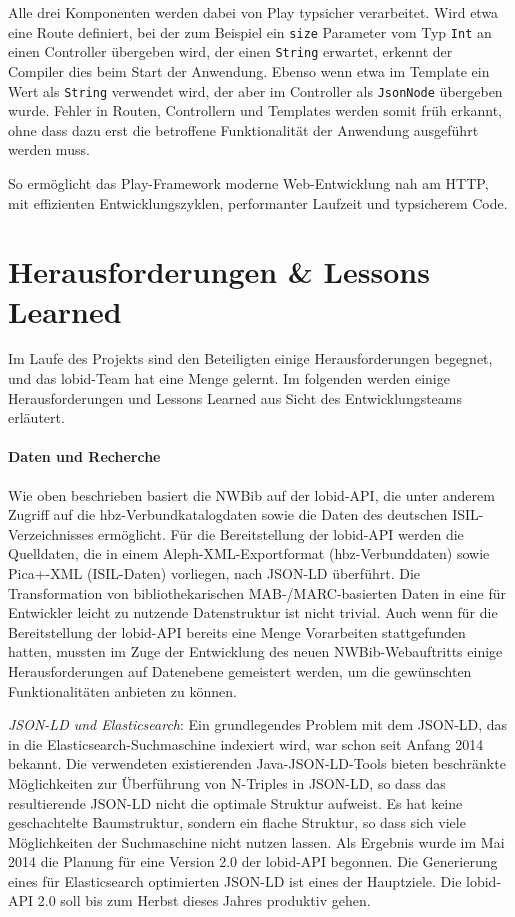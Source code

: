 \documentclass[a4paper,
fontsize=11pt,
oneside,
numbers=noperiodatend,
parskip=half-,
bibliography=totoc,
final
]{scrartcl}
\begin{document}
Alle drei Komponenten werden dabei von Play typsicher verarbeitet. Wird
etwa eine Route definiert, bei der zum Beispiel ein \texttt{size}
Parameter vom Typ \texttt{Int} an einen Controller übergeben wird, der
einen \texttt{String} erwartet, erkennt der Compiler dies beim Start der
Anwendung. Ebenso wenn etwa im Template ein Wert als \texttt{String}
verwendet wird, der aber im Controller als \texttt{JsonNode} übergeben
wurde. Fehler in Routen, Controllern und Templates werden somit früh
erkannt, ohne dass dazu erst die betroffene Funktionalität der Anwendung
ausgeführt werden muss.

So ermöglicht das Play-Framework moderne Web-Entwicklung nah am HTTP,
mit effizienten Entwicklungszyklen, performanter Laufzeit und
typsicherem Code.

\section*{Herausforderungen \& Lessons
Learned}\label{herausforderungen-lessons-learned}

Im Laufe des Projekts sind den Beteiligten einige Herausforderungen
begegnet, und das lobid-Team hat eine Menge gelernt. Im folgenden werden
einige Herausforderungen und Lessons Learned aus Sicht des
Entwicklungsteams erläutert.

\paragraph{Daten und Recherche}\label{daten-und-recherche}

Wie oben beschrieben basiert die NWBib auf der lobid-API, die unter
anderem Zugriff auf die hbz-Verbundkatalogdaten sowie die Daten des
deutschen ISIL-Verzeichnisses ermöglicht. Für die Bereitstellung der
lobid-API werden die Quelldaten, die in einem Aleph-XML-Exportformat
(hbz-Verbunddaten) sowie Pica+-XML (ISIL-Daten) vorliegen, nach JSON-LD
überführt. Die Transformation von bibliothekarischen MAB-/MARC-basierten
Daten in eine für Entwickler leicht zu nutzende Datenstruktur ist nicht
trivial. Auch wenn für die Bereitstellung der lobid-API bereits eine
Menge Vorarbeiten stattgefunden hatten, mussten im Zuge der Entwicklung
des neuen NWBib-Webauftritts einige Herausforderungen auf Datenebene
gemeistert werden, um die gewünschten Funktionalitäten anbieten zu
können.

\emph{JSON-LD und Elasticsearch}: Ein grundlegendes Problem mit dem
JSON-LD, das in die Elasticsearch-Suchmaschine indexiert wird, war schon
seit Anfang 2014 bekannt. Die verwendeten existierenden
Java-JSON-LD-Tools bieten beschränkte Möglichkeiten zur Überführung von
N-Triples in JSON-LD, so dass das resultierende JSON-LD nicht die
optimale Struktur aufweist. Es hat keine geschachtelte Baumstruktur,
sondern ein flache Struktur, so dass sich viele Möglichkeiten der
Suchmaschine nicht nutzen lassen. Als Ergebnis wurde im Mai 2014 die
Planung für eine Version 2.0 der lobid-API begonnen. Die Generierung
eines für Elasticsearch optimierten JSON-LD ist eines der Hauptziele.
Die lobid-API 2.0 soll bis zum Herbst dieses Jahres produktiv gehen.
\end{document}
